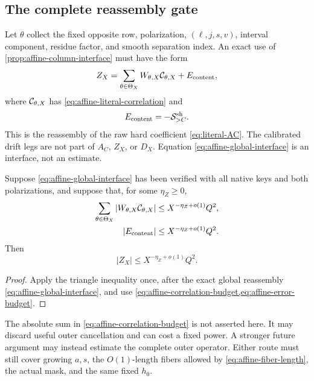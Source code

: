 \subsection{The complete reassembly gate}

Let \(\theta\) collect the fixed opposite row, polarization,
\((\ell,j,s,v)\), interval component, residue factor, and smooth
separation index.  An exact use of
\cref{prop:affine-column-interface} must have the form
\begin{equation}
 Z_X
 =\sum_{\theta\in\Theta_X}
 W_{\theta,X}\mathcal C_{\theta,X}
 +E_{\rm content},
 \label{eq:affine-global-interface}
\end{equation}
where \(\mathcal C_{\theta,X}\) has
\eqref{eq:affine-literal-correlation} and
\begin{equation}
 E_{\rm content}=-\mathcal S_{>C}^{\rm sh}.
 \label{eq:affine-content-error}
\end{equation}
This is the reassembly of the raw hard coefficient
\eqref{eq:literal-AC}.  The calibrated drift legs are not part of
\(A_C\), \(Z_X\), or \(D_X\).
Equation \eqref{eq:affine-global-interface} is an interface, not an
estimate.

\begin{proposition}
\label{prop:affine-sufficient-budget}
Suppose \eqref{eq:affine-global-interface} has been verified with all
native keys and both polarizations, and suppose that, for some
\(\eta_Z\ge0\),
\begin{align}
 \sum_{\theta\in\Theta_X}
 |W_{\theta,X}\mathcal C_{\theta,X}|
 &\le X^{-\eta_Z+o(1)}Q^2,
 \label{eq:affine-correlation-budget}\\
 |E_{\rm content}|
 &\le X^{-\eta_Z+o(1)}Q^2.
 \label{eq:affine-error-budget}
\end{align}
Then
\begin{equation}
 |Z_X|\le X^{-\eta_Z+o(1)}Q^2.
 \label{eq:affine-zero-bound}
\end{equation}
\end{proposition}

\begin{proof}
Apply the triangle inequality once, after the exact global
reassembly \eqref{eq:affine-global-interface}, and use
\cref{eq:affine-correlation-budget,eq:affine-error-budget}.
\end{proof}

\begin{remark}
The absolute sum in \eqref{eq:affine-correlation-budget} is not
asserted here.  It may discard useful outer cancellation and can cost
a fixed power.  A stronger future argument may instead estimate the
complete outer operator.  Either route must still cover growing
\(a,s\), the \(O(1)\)-length fibers allowed by
\eqref{eq:affine-fiber-length}, the actual mask, and the same fixed
\(h_0\).
\end{remark}

